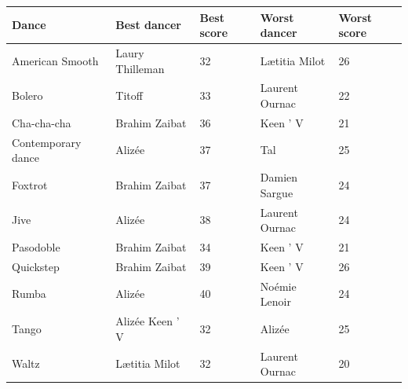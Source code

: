 \documentclass{article}
\begin{document}
\begin{tabular}{lllll}
\toprule
Dance & Best dancer & Best score & Worst dancer & Worst score \\
\midrule
American Smooth & Laury Thilleman & 32 & Lætitia Milot & 26 \\
Bolero & Titoff & 33 & Laurent Ournac & 22 \\
Cha-cha-cha & Brahim Zaibat & 36 & Keen ' V & 21 \\
Contemporary dance & Alizée & 37 & Tal & 25 \\
Foxtrot & Brahim Zaibat & 37 & Damien Sargue & 24 \\
Jive & Alizée & 38 & Laurent Ournac & 24 \\
Pasodoble & Brahim Zaibat & 34 & Keen ' V & 21 \\
Quickstep & Brahim Zaibat & 39 & Keen ' V & 26 \\
Rumba & Alizée & 40 & Noémie Lenoir & 24 \\
Tango & Alizée Keen ' V & 32 & Alizée & 25 \\
Waltz & Lætitia Milot & 32 & Laurent Ournac & 20 \\
\bottomrule
\end{tabular}
\end{document}
